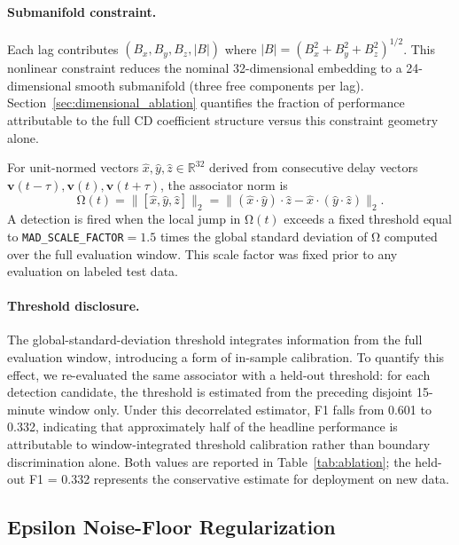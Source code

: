\documentclass[draft]{agujournal2025}
\newcommand{\Assoc}{\mathrm{\Omega}}
\begin{document}
\paragraph{Submanifold constraint.}
Each lag contributes $(B_x, B_y, B_z, |B|)$ where
$|B| = (B_x^2+B_y^2+B_z^2)^{1/2}$. This nonlinear constraint reduces the
nominal 32-dimensional embedding to a 24-dimensional smooth submanifold
(three free components per lag).  Section~\ref{sec:dimensional_ablation}
quantifies the fraction of performance attributable to the full CD coefficient
structure versus this constraint geometry alone.

For unit-normed vectors $\hat{x}, \hat{y}, \hat{z} \in \mathbb{R}^{32}$
derived from consecutive delay vectors
$\mathbf{v}(t-\tau), \mathbf{v}(t), \mathbf{v}(t+\tau)$,
the associator norm is
\begin{equation}
  \Assoc(t) = \bigl\| [\hat{x}, \hat{y}, \hat{z}] \bigr\|_2
             = \bigl\| (\hat{x} \cdot \hat{y}) \cdot \hat{z}
               - \hat{x} \cdot (\hat{y} \cdot \hat{z}) \bigr\|_2.
  \label{eq:associator}
\end{equation}
A detection is fired when the local jump in $\Assoc(t)$ exceeds a fixed
threshold equal to \texttt{MAD\_SCALE\_FACTOR}$= 1.5$ times the global standard
deviation of $\Assoc$ computed over the full evaluation window.
This scale factor was fixed prior to any evaluation on labeled test data.

\paragraph{Threshold disclosure.}
The global-standard-deviation threshold integrates information from the
full evaluation window, introducing a form of in-sample calibration.
To quantify this effect, we re-evaluated the same associator with a held-out
threshold: for each detection candidate, the threshold is estimated from the
preceding disjoint 15-minute window only.  Under this decorrelated estimator,
F1 falls from 0.601 to 0.332, indicating that approximately half of the
headline performance is attributable to window-integrated threshold calibration
rather than boundary discrimination alone.
Both values are reported in Table~\ref{tab:ablation}; the held-out F1 = 0.332
represents the conservative estimate for deployment on new data.

\subsection{Epsilon Noise-Floor Regularization}
\end{document}
